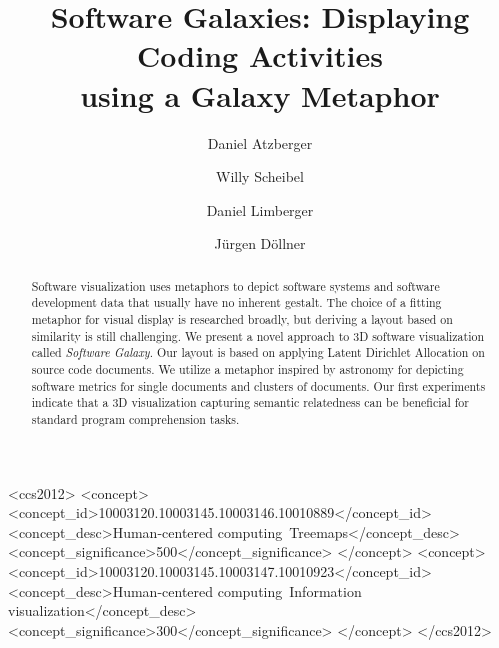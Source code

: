 \documentclass[sigconf%
,natbib=true%
]{acmart}
\begin{document}
\title[Software Galaxies]{Software Galaxies: Displaying Coding Activities\\using a Galaxy Metaphor}

\author{Daniel Atzberger}
\author{Willy Scheibel}
\author{Daniel Limberger}
\author{J{\"u}rgen D{\"o}llner}

\renewcommand{\shortauthors}{D.~Atzberger, W.~Scheibel, D.~Limberger, J.~D{\"o}llner}

\begin{abstract}
    Software visualization uses metaphors to depict software systems and software development data that usually have no inherent gestalt.
    The choice of a fitting metaphor for visual display is researched broadly, but deriving a layout based on similarity is still challenging.
    We present a novel approach to 3D software visualization called \emph{Software Galaxy}.
    Our layout is based on applying Latent Dirichlet Allocation on source code documents.
    We utilize a metaphor inspired by astronomy for depicting software metrics for single documents and clusters of documents.
    Our first experiments indicate that a 3D visualization capturing semantic relatedness can be beneficial for standard program comprehension tasks.
\end{abstract}

\begin{CCSXML}
	<ccs2012>
	<concept>
	<concept_id>10003120.10003145.10003146.10010889</concept_id>
	<concept_desc>Human-centered computing~Treemaps</concept_desc>
	<concept_significance>500</concept_significance>
	</concept>
	<concept>
	<concept_id>10003120.10003145.10003147.10010923</concept_id>
	<concept_desc>Human-centered computing~Information visualization</concept_desc>
	<concept_significance>300</concept_significance>
	</concept>
	</ccs2012>
\end{CCSXML}

\end{document}
